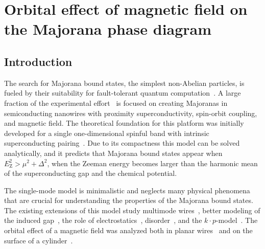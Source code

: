 \chapter{Orbital effect of magnetic field on the Majorana phase diagram}
\label{ch:orbitalfield}


\newpage
\noindent

\section{Introduction}
The search for Majorana bound states, the simplest non-Abelian particles, is fueled by their suitability for fault-tolerant quantum computation~\cite{Alicea2012,Beenakker2013}.
A large fraction of the experimental effort~\cite{Mourik2012,Das2012,Deng2012,Churchill2013,Deng2014} is focused on creating Majoranas in semiconducting nanowires with proximity superconductivity, spin-orbit coupling, and magnetic field.
The theoretical foundation for this platform was initially developed for a single one-dimensional spinful band with intrinsic superconducting pairing~\cite{Lutchyn2010,Oreg2010}.
Due to its compactness this model can be solved analytically, and it predicts that Majorana bound states appear when $E_\textrm{Z}^{2}>\mu^{2}+\Delta^{2}$, when the Zeeman energy becomes larger than the harmonic mean of the superconducting gap and the chemical potential.

The single-mode model is minimalistic and neglects many physical phenomena that are crucial for understanding the properties of the Majorana bound states.
The existing extensions of this model study multimode wires~\cite{Potter2010}, better modeling of the induced gap~\cite{Liu2012,Stanescu2014}, the role of electrostatics~\cite{Vuik2016}, disorder~\cite{Potter2012,Pientka2012,Adagideli2014}, and the $k \cdot p$-model~\cite{Stanescu2013a}.
The orbital effect of a magnetic field was analyzed both in planar wires~\cite{Osca2015, Lim2012} and on the surface of a cylinder~\cite{Lim2013}.

